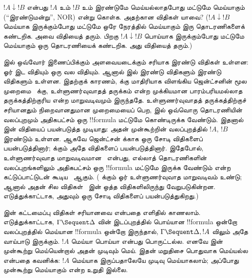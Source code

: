 \documentclass[../../../include/open-logic-section]{subfiles}
\begin{document}
\begin{prob}
$!A \downarrow !B$ என்பது $!A$ உம்
$!B$ உம் இரண்டுமே மெய்யல்லாதபோது
மட்டுமே மெய்யாகும் (“இரண்டுமன்று”, NOR) என்று
கொள்க. அதற்கான  விதிகள் யாவை?
($!A \downarrow !B$ மெய்யாக இருக்கும்போது
மட்டுமே ஒரே நேரத்தில் மெய்யாகும்
இரு தொடரணிகளைக் கண்டறிக. அவை
\RightR{\downarrow} விதியைத் தரும்.
பிறகு $!A \downarrow !B$ பொய்யாக
இருக்கும்போது மட்டுமே மெய்யாகும்
ஒரு தொடரணியைக் கண்டறிக. அது
\LeftR{\downarrow} விதியைத் தரும்.)
\end{prob}

 இல் ஒவ்வோர் இணைப்பிக்கும்
அளவையடைக்கும் சரியாக இரண்டு விதிகள்
உள்ளன: ஓர் இட விதியும் ஒரு வல விதியும்.
ஆனால்  இல் இரண்டு
\LeftR{\land} விதிகளும் இரண்டு
\RightR{\lor} விதிகளும் உள்ளன.
இதற்குக் காரணம்,  க்கு
மாதிரியாக விளங்கிய ஜென்ட்சனின்
மூல முறைமை~ க்கு,
உள்ளுணர்வுவாதத் தருக்கம் என்ற முக்கியமான
பாரம்பரியமல்லாத தருக்கத்திற்குரிய
 என்ற மாறுவடிவமும் இருந்ததே.
உள்ளுணர்வுவாதத் தருக்கத்திற்குச் சரியானதும்
நிறைவானதுமான முறைமையைப் பெற,
 இல் ஒவ்வொரு தொடரணியின்
வலப்புறமும் அதிகபட்சம் ஒரு
!!{formula} மட்டுமே கொண்டிருக்க
வேண்டும். இதனால்  இன்
\RightR{\lor} விதியைப் பயன்படுத்த
முடியாது: அதன் முன்கூற்றின்
வலப்புறத்தில் $!A$, $!B$ இரண்டும்
உள்ளன. ஆகவே ஜென்ட்சன் 
க்காக ஒரு சோடி \RightR{\lor}
விதிகளைப் பயன்படுத்தினார்;
 க்கும் அதே விதிகளைப்
பயன்படுத்தினார். இதேபோல்,
உள்ளுணர்வுவாத மாறுவடிவமான~
என்பது, எல்லாத் தொடரணிகளின்
வலப்புறங்களிலும் அதிகபட்சம் ஒரு
!!{formula} மட்டுமே இருக்க வேண்டும்
என்ற கட்டுப்பாட்டுடன் கூடிய~
ஆகும். ( க்கும் ஓர்
உள்ளுணர்வுவாத மாறுவடிவம் உண்டு;
ஆனால் அதன் சில விதிகள்~
இன் ஒத்த விதிகளிலிருந்து வேறுபடுகின்றன.
எடுத்துக்காட்டாக, அதுவும் ஒரு சோடி
\RightR{\lor} விதிகளைப் பயன்படுத்துகிறது.)

 இன் கட்டமைப்பு விதிகள்
சரியானவை என்பதை எளிதில் காணலாம்.
எடுத்துக்காட்டாக, $\Gamma \Sequent
\Delta$ வின் இடப்புறத்தில் பொய்யான
!!{formula} ஒன்றோ வலப்புறத்தில்
மெய்யான !!{formula} ஒன்றோ
இருந்தால், $\Gamma \Sequent
\Delta, !A$ விலும் அதே
வாய்பாடு இருக்கும். $!A$
மெய்யா பொய்யா என்பது
பொருட்டல்ல. எனவே
\RightR{\Weakening} இன்
முன்கூற்று மெய்யென்றால் அதன்
முடிவும் மெய். இதன் மறுதிசை
பொதுவாக மெய்யல்ல என்பதை
கவனிக்க: $!A$ மெய்யாக
இருப்பதாலேயே முடிவு
மெய்யாகலாம்; அப்போது
முன்கூற்று மெய்யாகும்
என்ற உறுதி இல்லை.
\end{document}
